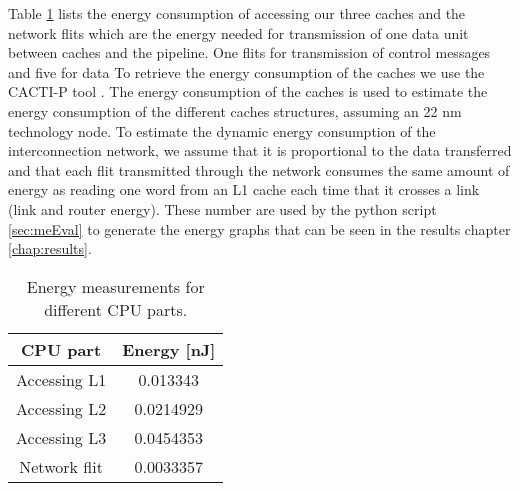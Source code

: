 Table \ref{tab:energy} lists the energy consumption of accessing our three caches and the network
flits which are the energy needed for transmission of one data unit between caches and
the pipeline. One flits for transmission of control messages and five for data \cite{thePaper}
To retrieve the energy consumption of the caches we use the CACTI-P tool \cite{energy2}. The energy consumption of the caches is used to
estimate the energy consumption of the different caches structures, assuming an 22 nm
technology node. To estimate the dynamic energy consumption of the interconnection
network, we assume that it is proportional to the data transferred \cite{energy} and that each
flit transmitted through the network consumes the same amount of energy as reading
one word from an L1 cache each time that it crosses a link (link and router energy).
These number are used by the python script \ref{sec:meEval} to generate the energy graphs that can be seen in the results chapter \ref{chap:results}.
\begin{table}[h]
    \begin{centering}
        \begin{tabular}{ |c|c| }
            \hline
            CPU part & Energy [nJ] \\ \hline
            Accessing L1 & 0.013343 \\ \hline
            Accessing L2 & 0.0214929 \\ \hline
            Accessing L3 & 0.0454353 \\ \hline
            Network flit & 0.0033357 \\ \hline
        \end{tabular}
        \caption{Energy measurements for different CPU parts.}
        \label{tab:energy}
    \end{centering}
\end{table}







